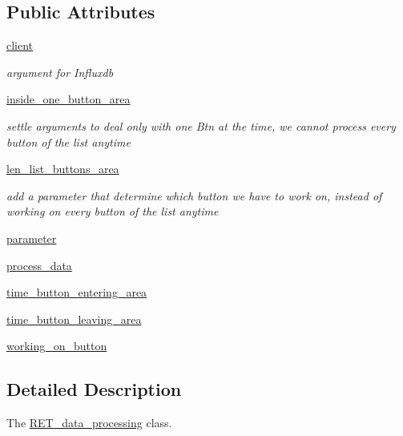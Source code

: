 \subsection*{Public Attributes}
\begin{DoxyCompactItemize}
\item 
\hyperlink{classRET__data__processing_1_1RET__data__processing_ad5bc32b75da65fe60067f501a4bb6665}{client}
\begin{DoxyCompactList}\small\item\em argument for Influxdb \end{DoxyCompactList}\item 
\hyperlink{classRET__data__processing_1_1RET__data__processing_af140727efa8da9cde0e592a61407d62f}{inside\+\_\+one\+\_\+button\+\_\+area}
\begin{DoxyCompactList}\small\item\em settle arguments to deal only with one Btn at the time, we cannot process every button of the list anytime \end{DoxyCompactList}\item 
\hyperlink{classRET__data__processing_1_1RET__data__processing_acbbf8e6a1d50b851956b602b4b62407d}{len\+\_\+list\+\_\+buttons\+\_\+area}
\begin{DoxyCompactList}\small\item\em add a parameter that determine which button we have to work on, instead of working on every button of the list anytime \end{DoxyCompactList}\item 
\hyperlink{classRET__data__processing_1_1RET__data__processing_a0d71b5c1dcca8d3fee88d6a11d3e2071}{parameter}
\item 
\hyperlink{classRET__data__processing_1_1RET__data__processing_ae694f95e6ad7f44763d44d68466b8011}{process\+\_\+data}
\item 
\hyperlink{classRET__data__processing_1_1RET__data__processing_ac0425558ab7dcdbba51ca961404b8197}{time\+\_\+button\+\_\+entering\+\_\+area}
\item 
\hyperlink{classRET__data__processing_1_1RET__data__processing_a569f33dfaf2e66a965f1e2bf43ce7bdd}{time\+\_\+button\+\_\+leaving\+\_\+area}
\item 
\hyperlink{classRET__data__processing_1_1RET__data__processing_a96204c1a4417d5a3a980521f8a66a1fa}{working\+\_\+on\+\_\+button}
\end{DoxyCompactItemize}


\subsection{Detailed Description}
The \hyperlink{classRET__data__processing_1_1RET__data__processing}{R\+E\+T\+\_\+data\+\_\+processing} class. 

